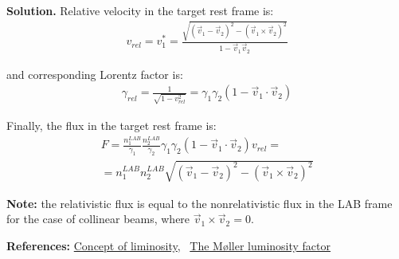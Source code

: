 \documentclass[11pt,a4paper]{article}
\newenvironment{solution}{\vspace{1cm} \par\textbf{Solution.} \vspace{1cm}}{\newpage}
\begin{document}
\begin{solution}
Relative velocity in the target rest frame is:
\begin{align*}
  v_{rel} = v_{1}^{*} = \frac{\sqrt{(\vec{v}_{1} - \vec{v}_{2})^{2} - (\vec{v}_{1} \times \vec{v}_{2})^2}}{1 - \vec{v}_{1}\vec{v}_{2}}
\end{align*}

and corresponding Lorentz factor is:
\begin{align*}
  \gamma_{rel} = \frac{1}{\sqrt{1 - v_{rel}^{2}}} = 
  \gamma_{1} \gamma_{2} (1 - \vec{v}_{1} \cdot \vec{v}_{2})
\end{align*}

Finally, the flux in the target rest frame is:
\begin{align*}
  F = \frac{n_{1}^{LAB}}{\gamma_{1}}\frac{n_{2}^{LAB}}{\gamma_{2}} \gamma_{1} \gamma_{2} (1 - \vec{v}_{1} \cdot \vec{v}_{2}) v_{rel} = \\
  = n_{1}^{LAB} n_{2}^{LAB}\sqrt{(\vec{v}_{1} - \vec{v}_{2})^{2} - (\vec{v}_{1} \times \vec{v}_{2})^2}
\end{align*}

\vspace{0.2cm}

{\bf Note:} the relativistic flux is equal to the nonrelativistic flux in the LAB frame
for the case of collinear beams, where $\vec{v}_{1} \times \vec{v}_{2} = 0$.

\vspace{0.5cm}

{\bf References:}
\href{https://cds.cern.ch/record/941318/files/p361.pdf}{Concept of liminosity},~
\href{https://www.osti.gov/servlets/purl/836235}{The M\o ller luminosity factor}

\end{solution}

\end{document}
